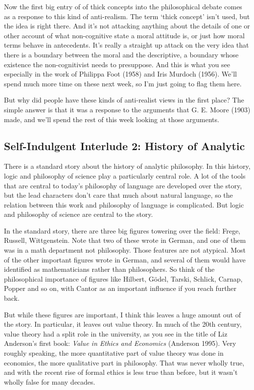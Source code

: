 \documentclass[
]{article}
\begin{document}
Now the first big entry of of thick concepts into the philosophical
debate comes as a response to this kind of anti-realism. The term `thick
concept' isn't used, but the idea is right there. And it's not attacking
anything about the details of one or other account of what non-cognitive
state a moral attitude is, or just how moral terms behave in
antecedents. It's really a straight up attack on the very idea that
there is a boundary between the moral and the descriptive, a boundary
whose existence the non-cognitivist needs to presuppose. And this is
what you see especially in the work of Philippa Foot (1958) and Iris
Murdoch (1956). We'll spend much more time on these next week, so I'm
just going to flag them here.

But why did people have these kinds of anti-realist views in the first
place? The simple answer is that it was a response to the arguments that
G. E. Moore (1903) made, and we'll spend the rest of this week looking
at those arguments.

\hypertarget{self-indulgent-interlude-2-history-of-analytic}{%
\subsection{Self-Indulgent Interlude 2: History of
Analytic}\label{self-indulgent-interlude-2-history-of-analytic}}

There is a standard story about the history of analytic philosophy. In
this history, logic and philosophy of science play a particularly
central role. A lot of the tools that are central to today's philosophy
of language are developed over the story, but the lead characters don't
care that much about natural language, so the relation between this work
and philosophy of language is complicated. But logic and philosophy of
science are central to the story.

In the standard story, there are three big figures towering over the
field: Frege, Russell, Wittgenstein. Note that two of these wrote in
German, and one of them was in a math department not philosophy. Those
features are not atypical. Most of the other important figures wrote in
German, and several of them would have identified as mathematicians
rather than philosophers. So think of the philosophical importance of
figures like Hilbert, Gödel, Tarski, Schlick, Carnap, Popper and so on,
with Cantor as an important influence if you reach further back.

But while these figures are important, I think this leaves a huge amount
out of the story. In particular, it leaves out value theory. In much of
the 20th century, value theory had a split role in the university, as
you see in the title of Liz Anderson's first book: \emph{Value in Ethics
and Economics} (Anderson 1995). Very roughly speaking, the more
quantitative part of value theory was done in economics, the more
qualitative part in philosophy. That was never wholly true, and with the
recent rise of formal ethics is less true than before, but it wasn't
wholly false for many decades.
\end{document}
